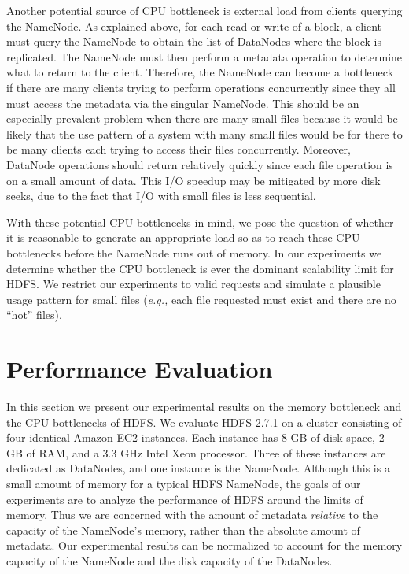 \documentclass[11pt, a4paper]{article}
\begin{document}
\begin{multicols*}{2}
Another potential source of CPU bottleneck is external load from clients querying the NameNode. As explained above, for each read or write of a block, a client must query the NameNode to obtain the list of DataNodes where the block is replicated. The NameNode must then perform a metadata operation to determine what to return to the client. Therefore, the NameNode can become a bottleneck if there are many clients trying to perform operations concurrently since they all must access the metadata via the singular NameNode. This should be an especially prevalent problem when there are many small files because it would be likely that the use pattern of a system with many small files would be for there to be many clients each trying to access their files concurrently. Moreover, DataNode operations should return relatively quickly since each file operation is on a small amount of data. This I/O speedup may be mitigated by more disk seeks, due to the fact that I/O with small files is less sequential.

With these potential CPU bottlenecks in mind, we pose the question of whether it is reasonable to generate an appropriate load so as to reach these CPU bottlenecks before the NameNode runs out of memory. In our experiments we determine whether the CPU bottleneck is ever the dominant scalability limit for HDFS. We restrict our experiments to valid requests and simulate a plausible usage pattern for small files (\textit{e.g.,} each file requested must exist and there are no ``hot'' files).

\section{Performance Evaluation}

In this section we present our experimental results on the memory bottleneck and the CPU bottlenecks of HDFS. We evaluate HDFS 2.7.1 on a cluster consisting of four identical Amazon EC2 instances. Each instance has 8 GB of disk space, 2 GB of RAM, and a 3.3 GHz Intel Xeon processor. Three of these instances are dedicated as DataNodes, and one instance is the NameNode. Although this is a small amount of memory for a typical HDFS NameNode, the goals of our experiments are to analyze the performance of HDFS around the limits of memory. Thus we are concerned with the amount of metadata \textit{relative} to the capacity of the NameNode's memory, rather than the absolute amount of metadata. Our experimental results can be normalized to account for the memory capacity of the NameNode and the disk capacity of the DataNodes.


\end{multicols*}
\end{document}
